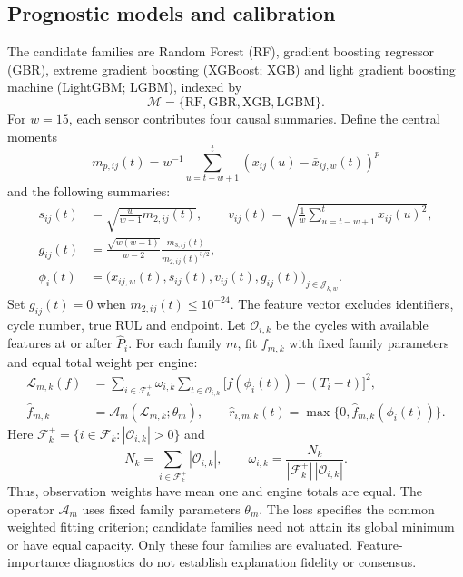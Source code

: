 \documentclass[12pt]{article}
\begin{document}
\subsection{Prognostic models and calibration}

The candidate families are Random Forest (RF), gradient boosting regressor (GBR), extreme gradient boosting (XGBoost; XGB) and light gradient boosting machine (LightGBM; LGBM), indexed by
\[
\mathcal M=\{\mathrm{RF},\mathrm{GBR},\mathrm{XGB},\mathrm{LGBM}\}.
\]
For $w=15$, each sensor contributes four causal summaries. Define the central moments
\[
m_{p,ij}(t)=w^{-1}\sum_{u=t-w+1}^{t}(x_{ij}(u)-\bar x_{ij,w}(t))^p
\]
and the following summaries:
\[
\begin{split}
s_{ij}(t)&=\sqrt{\frac{w}{w-1}m_{2,ij}(t)},\qquad
v_{ij}(t)=\sqrt{\frac1w\sum_{u=t-w+1}^{t}x_{ij}(u)^2},\\
g_{ij}(t)&=\frac{\sqrt{w(w-1)}}{w-2}
\frac{m_{3,ij}(t)}{m_{2,ij}(t)^{3/2}},\\
\phi_i(t)&=\bigl(\bar x_{ij,w}(t),s_{ij}(t),v_{ij}(t),g_{ij}(t)\bigr)_{j\in\mathcal J_{k,w}}.
\end{split}
\]
Set $g_{ij}(t)=0$ when $m_{2,ij}(t)\leq10^{-24}$. The feature vector excludes identifiers, cycle number, true RUL and endpoint. Let $\mathcal O_{i,k}$ be the cycles with available features at or after $\widehat P_i$. For each family $m$, fit $f_{m,k}$ with fixed family parameters and equal total weight per engine:
\[
\begin{split}
\mathcal L_{m,k}(f)&=\sum_{i\in\mathcal F_k^+}\omega_{i,k}
\sum_{t\in\mathcal O_{i,k}}\bigl[f(\phi_i(t))-(T_i-t)\bigr]^2,\\
\widehat f_{m,k}&=\mathcal A_m(\mathcal L_{m,k};\theta_m),\qquad
\widehat r_{i,m,k}(t)=\max\{0,\widehat f_{m,k}(\phi_i(t))\}.
\end{split}
\]
Here $\mathcal F_k^+=\{i\in\mathcal F_k:|\mathcal O_{i,k}|>0\}$ and
\[
N_k=\sum_{i\in\mathcal F_k^+}|\mathcal O_{i,k}|,\qquad
\omega_{i,k}=\frac{N_k}{|\mathcal F_k^+|\,|\mathcal O_{i,k}|}.
\]
Thus, observation weights have mean one and engine totals are equal. The operator $\mathcal A_m$ uses fixed family parameters $\theta_m$. The loss specifies the common weighted fitting criterion; candidate families need not attain its global minimum or have equal capacity. Only these four families are evaluated. Feature-importance diagnostics do not establish explanation fidelity or consensus.
\end{document}
